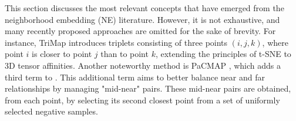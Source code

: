 \begin{remark}
    This section discusses the most relevant concepts that have emerged from the neighborhood embedding (NE) literature. However, it is not exhaustive, and many recently proposed approaches are omitted for the sake of brevity. For instance, TriMap \citep{amid2019trimap} introduces triplets consisting of three points $ (i, j, k) $, where point $ i $ is closer to point $ j $ than to point $ k $, extending the principles of t-SNE to 3D tensor affinities. Another noteworthy method is PaCMAP \citep{wang2021understanding}, which adds a third term to . This additional term aims to better balance near and far relationships by managing "mid-near" pairs. These mid-near pairs are obtained, from each point, by selecting its second closest point from a set of uniformly selected negative samples.
\end{remark}
